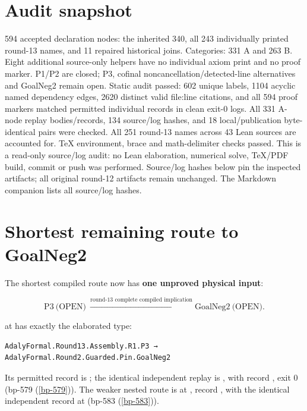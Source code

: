\section{Audit snapshot}
594 accepted declaration nodes: the inherited 340, all 243 individually printed round-13 names, and 11 repaired historical joins. Categories: 331 A and 263 B. Eight additional source-only helpers have no individual axiom print and no proof marker. P1/P2 are closed; P3, cofinal noncancellation/detected-line alternatives and GoalNeg2 remain open. Static audit passed: 602 unique labels, 1104 acyclic named dependency edges, 2620 distinct valid file:line citations, and all 594 proof markers matched permitted individual records in clean exit-0 logs. All 331 A-node replay bodies/records, 134 source/log hashes, and 18 local/publication byte-identical pairs were checked. All 251 round-13 names across 43 Lean sources are accounted for. TeX environment, brace and math-delimiter checks passed. This is a read-only source/log audit: no Lean elaboration, numerical solve, TeX/PDF build, commit or push was performed. Source/log hashes below pin the inspected artifacts; all original round-12 artifacts remain unchanged. The Markdown companion lists all source/log hashes.

\section{Shortest remaining route to GoalNeg2}

The shortest compiled route now has \textbf{one unproved physical input}:

\[
\boxed{\mathrm{P3}\ \text{(OPEN)}}
\ \xrightarrow{\text{round-13 complete compiled implication}}
\boxed{\mathrm{GoalNeg2}\ \text{(OPEN)}}.
\]

\texttt{} at \texttt{} has exactly the elaborated type:

\begin{verbatim}
AdalyFormal.Round13.Assembly.R1.P3 → AdalyFormal.Round2.Guarded.Pin.GoalNeg2
\end{verbatim}

Its permitted record is \texttt{}; the identical independent replay is \texttt{}, with record \texttt{}, exit 0 (bp-579 (\ref{bp-579})). The weaker nested route is \texttt{} at \texttt{}, record \texttt{}, with the identical independent record at \texttt{} (bp-583 (\ref{bp-583})).

